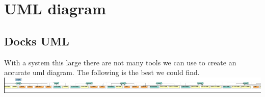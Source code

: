 \documentclass[a4paper]{article}
\begin{document}
\section{UML diagram}
\subsection { Docks UML }
With a system this large there are not many tools we can use to create an accurate uml diagram.
The following is the best we could find.\\

\includegraphics[scale=0.5]{uml.png}\\
\end{document}
